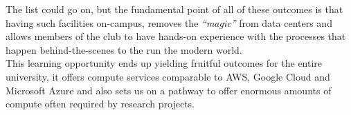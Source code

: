 \documentclass[a4paper,11pt,twocolumn,oneside]{book}
\begin{document}
    The list could go on, but the fundamental point of all of these outcomes is that having such facilities on-campus,
    removes the \emph{``magic''} from data centers and allows members of the club to have hands-on experience with the
    processes that happen behind-the-scenes to the run the modern world.\\
    This learning opportunity ends up yielding fruitful outcomes for the entire university, it offers compute
    services comparable to AWS, Google Cloud and Microsoft Azure and also sets us on a pathway to offer enormous
    amounts of compute often required by research projects.


\end{document}
